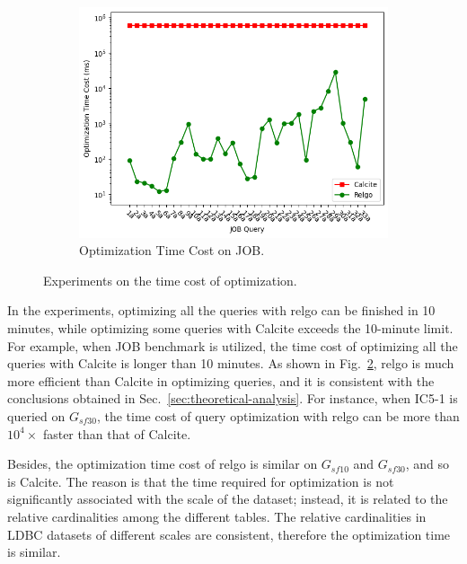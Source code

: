 \begin{figure}
    \begin{subfigure}[b]{0.3\linewidth}
        \centering
        \includegraphics[width=\linewidth]{./figures/exp/optimization_job.png}
        \caption{Optimization Time Cost on JOB.}
        \label{fig:exp-optimization-job}
    \end{subfigure}
    \caption{Experiments on the time cost of optimization.}
    \label{fig:exp-optimization}
\end{figure}

In the experiments, optimizing all the queries with relgo can be finished in 10 minutes, while optimizing some queries with Calcite exceeds the 10-minute limit.
For example, when JOB benchmark is utilized, the time cost of optimizing all the queries with Calcite is longer than 10 minutes.
As shown in Fig.~\ref{fig:exp-optimization}, relgo is much more efficient than Calcite in optimizing queries, and it is consistent with the conclusions obtained in Sec.~\ref{sec:theoretical-analysis}.
For instance, when IC5-1 is queried on $G_{sf30}$, the time cost of query optimization with relgo can be more than $10^4\times$ faster than that of Calcite.

Besides, the optimization time cost of relgo is similar on $G_{sf10}$ and $G_{sf30}$, and so is Calcite.
The reason is that the time required for optimization is not significantly associated with the scale of the dataset; instead, it is related to the relative cardinalities among the different tables.
The relative cardinalities in LDBC datasets of different scales are consistent, therefore the optimization time is similar.

